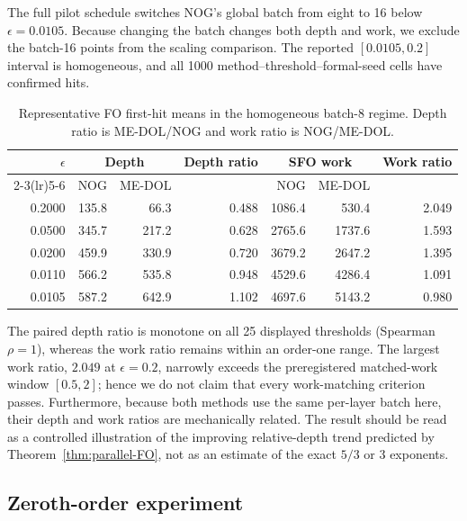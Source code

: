 The full pilot schedule switches NOG's global batch from eight to 16 below
$\epsilon=0.0105$.  Because changing the batch changes both depth and work, we
exclude the batch-16 points from the scaling comparison.  The reported
$[0.0105,0.2]$ interval is homogeneous, and all 1000
method--threshold--formal-seed cells have confirmed hits.

\begin{table}[t]
\centering
\caption{Representative FO first-hit means in the homogeneous batch-8
regime.  Depth ratio is ME-DOL/NOG and work ratio is NOG/ME-DOL.}
\label{tab:fo-representative}
\small
\begin{tabular}{@{}rrrrrrr@{}}
\toprule
$\epsilon$ & \multicolumn{2}{c}{Depth} & Depth ratio &
\multicolumn{2}{c}{SFO work} & Work ratio\\
\cmidrule(lr){2-3}\cmidrule(lr){5-6}
& NOG & ME-DOL && NOG & ME-DOL &\\
\midrule
0.2000 & 135.8 & 66.3  & 0.488 & 1086.4 & 530.4  & 2.049\\
0.0500 & 345.7 & 217.2 & 0.628 & 2765.6 & 1737.6 & 1.593\\
0.0200 & 459.9 & 330.9 & 0.720 & 3679.2 & 2647.2 & 1.395\\
0.0110 & 566.2 & 535.8 & 0.948 & 4529.6 & 4286.4 & 1.091\\
0.0105 & 587.2 & 642.9 & 1.102 & 4697.6 & 5143.2 & 0.980\\
\bottomrule
\end{tabular}
\end{table}

The paired depth ratio is monotone on all 25 displayed thresholds (Spearman
$\rho=1$), whereas the work ratio remains within an order-one range.  The
largest work ratio, $2.049$ at $\epsilon=0.2$, narrowly exceeds the
preregistered matched-work window $[0.5,2]$; hence we do not claim that every
work-matching criterion passes.  Furthermore, because both methods use the
same per-layer batch here, their depth and work ratios are mechanically
related.  The result should be read as a controlled illustration of the
improving relative-depth trend predicted by Theorem~\ref{thm:parallel-FO}, not
as an estimate of the exact $5/3$ or $3$ exponents.

\subsection{Zeroth-order experiment}\label{app:zo-experiments}

